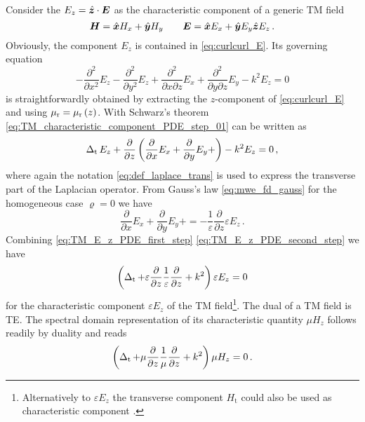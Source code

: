 
Consider the $E_z = \uv{z} \cdot \pvec{E}$ as the characteristic component
of a generic \ac{TM} field
\begin{equation}\label{eq:generic_TM_field_components}
	\pvec{H} = \uv{x}H_x + \uv{y}H_y 
	\qquad
	\pvec{E} = \uv{x}E_x + \uv{y}E_y \uv{z}E_z
	\, .
\end{equation}
Obviously, the component $E_z$ is contained in \eqref{eq:curlcurl_E}.
Its governing equation
\begin{equation}\label{eq:TM_characteristic_component_PDE_step_01}
	-\frac{\partial^2}{\partial x^2} E_z
	-\frac{\partial^2}{\partial y^2} E_z
	+\frac{\partial^2}{\partial x \partial z} E_x
	+\frac{\partial^2}{\partial y \partial z} E_y
	-k^2 E_z
	= 0
\end{equation}
is straightforwardly obtained by extracting the $z$-component of
\eqref{eq:curlcurl_E} and using $\mu_{\mathrm{r}} = \mu_{\mathrm{r}}\left(z\right)$.
With Schwarz's theorem \eqref{eq:TM_characteristic_component_PDE_step_01} can
be written as
\begin{equation}\label{eq:TM_E_z_PDE_first_step}
	\operatorname{\operatorname{\Delta}_\mathrm{t}} E_z
	+
	\frac{\partial}{\partial z}
	\left(
		\frac{\partial}{\partial x} E_x + 
		\frac{\partial}{\partial y} E_y + 
	\right)
	-
	k^2 E_z
	=
	0
	\, ,
\end{equation}
where again the notation \eqref{eq:def_laplace_trans} is used to express the
transverse part of the Laplacian operator.
From Gauss's law \eqref{eq:mwe_fd_gauss} for the homogeneous case $\varrho = 0$
we have
\begin{equation}\label{eq:TM_E_z_PDE_second_step}
	\frac{\partial}{\partial x} E_x + 
	\frac{\partial}{\partial y} E_y + 
	=
	-
	\frac{1}{\varepsilon}
	\frac{\partial}{\partial z}
	\varepsilon E_z
	\, .
\end{equation}
Combining \eqref{eq:TM_E_z_PDE_first_step} \eqref{eq:TM_E_z_PDE_second_step}
we have
\begin{equation}\label{eq:TM_characteristic_component_PDE}
	\left(
		\operatorname{\operatorname{\Delta}_\mathrm{t}} 
		+
		\varepsilon
		\frac{\partial}{\partial z}
		\frac{1}{\varepsilon}
		\frac{\partial}{\partial z}
		+
		k^2
	\right)
	\varepsilon E_z = 0
\end{equation}
for the characteristic component $\varepsilon E_z$ of the \ac{TM}
field\footnote{Alternatively to $\varepsilon E_z$ the transverse component
$H_\mathrm{t}$ could also be used as characteristic component
\cite[46]{Chew1999}.}.
The dual of a \ac{TM} field is \ac{TE}.
The spectral domain representation of its characteristic quantity $\mu H_z$
follows readily by duality and reads
\begin{equation}\label{eq:TE_characteristic_component_PDE}
	\left(
		\operatorname{\operatorname{\Delta}_\mathrm{t}} 
		+
		\mu
		\frac{\partial}{\partial z}
		\frac{1}{\mu}
		\frac{\partial}{\partial z}
		+
		k^2
	\right)
	\mu H_z = 0
	\, .
\end{equation}

